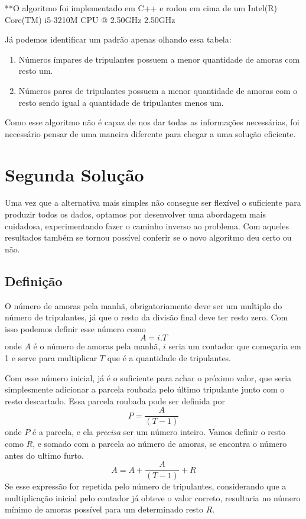 \documentclass[12pt]{article}
\begin{document}
**O algoritmo foi implementado em C++ e rodou em cima de um Intel(R) Core(TM) i5-3210M CPU @ 2.50GHz 2.50GHz

\vspace{0.5cm}

Já podemos identificar um padrão apenas olhando essa tabela:

\begin{enumerate}

\item Números ímpares de tripulantes possuem a menor quantidade de amoras com resto um.

\item Números pares de tripulantes possuem a menor quantidade de amoras com o resto sendo igual a quantidade de tripulantes menos um.

\end{enumerate}

Como esse algoritmo não é capaz de nos dar todas as informações necessárias, foi necessário pensar de uma maneira diferente para chegar a uma solução eficiente.

\section{Segunda Solução}

Uma vez que a alternativa mais simples não consegue ser flexível o suficiente para produzir todos os dados, optamos por desenvolver uma abordagem mais cuidadosa, experimentando fazer o caminho inverso ao problema. Com aqueles resultados também se tornou possível conferir se o novo algoritmo deu certo ou não.

\subsection{Definição}

O número de amoras pela manhã, obrigatoriamente deve ser um multiplo do número de tripulantes, já que o resto da divisão final deve ter resto zero. Com isso podemos definir esse número como \[A = i.T\] onde $A$ é o número de amoras pela manhã, $i$ seria um contador que começaria em 1 e serve para multiplicar $T$ que é a quantidade de tripulantes.

Com esse número inicial, já é o suficiente para achar o próximo valor, que seria simplesmente adicionar a parcela roubada pelo último tripulante junto com o resto descartado. Essa parcela roubada pode ser definida por \[P = \frac{A}{(T-1)}\] onde $P$ é a parcela, e ela \emph{precisa} ser um número inteiro. Vamos definir o resto como $R$, e somado com a parcela ao número de amoras, se encontra o número antes do ultimo furto. \[A = A + \frac{A}{(T-1)} + R\] Se esse expressão for repetida pelo número de tripulantes, considerando que a multiplicação inicial pelo contador já obteve o valor correto, resultaria no número mínimo de amoras possível para um determinado resto $R$.
\end{document}
